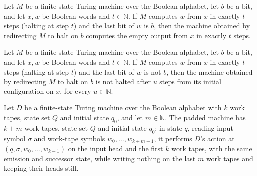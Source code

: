 \begin{theorem}
\label{Turing.FinTM.redirectTM_computes}
\leanok
{}
Let $M$ be a finite-state Turing machine over the Boolean alphabet, let $b$ be a bit,
and let $x,w$ be Boolean words and $t \in \mathbb{N}$. If $M$ computes $w$ from $x$ in
exactly $t$ steps (halting at step $t$) and the last bit of $w$ is $b$, then the machine
obtained by redirecting $M$ to halt on $b$ computes the empty output from $x$ in exactly
$t$ steps.
\end{theorem}

\begin{theorem}
\label{Turing.FinTM.redirectTM_live}
\leanok
{}
Let $M$ be a finite-state Turing machine over the Boolean alphabet, let $b$ be a bit,
and let $x,w$ be Boolean words and $t \in \mathbb{N}$. If $M$ computes $w$ from $x$ in
exactly $t$ steps (halting at step $t$) and the last bit of $w$ is not $b$, then the
machine obtained by redirecting $M$ to halt on $b$ is not halted after $u$ steps from
its initial configuration on $x$, for every $u \in \mathbb{N}$.
\end{theorem}

\begin{definition}
\label{Turing.FinTM.timedPadTM}
\leanok
{}
Let $D$ be a finite-state Turing machine over the Boolean alphabet with $k$ work tapes,
state set $Q$ and initial state $q_0$, and let $m \in \mathbb{N}$. The padded machine has
$k + m$ work tapes, state set $Q$ and initial state $q_0$; in state $q$, reading input
symbol $\sigma$ and work-tape symbols $w_0, \dots, w_{k+m-1}$, it performs $D$'s action
at $(q, \sigma, w_0, \dots, w_{k-1})$ on the input head and the first $k$ work tapes, with
the same emission and successor state, while writing nothing on the last $m$ work tapes
and keeping their heads still.
\end{definition}

